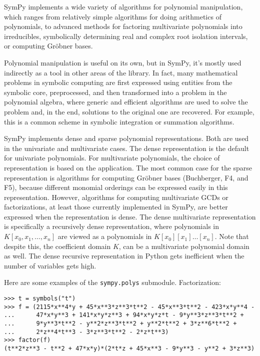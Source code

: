 
SymPy implements a wide variety of algorithms for polynomial manipulation,
which ranges from relatively simple algorithms for doing arithmetics of
polynomials, to advanced methods for factoring multivariate polynomials
into irreducibles, symbolically determining real and complex root isolation
intervals, or computing Gröbner bases.

Polynomial manipulation is useful on its own, but in SymPy, it's mostly used
indirectly as a tool in other areas of the library. In fact, many mathematical
problems in symbolic computing are first expressed using entities from the
symbolic core, preprocessed, and then transformed into a problem in the
polynomial algebra, where generic and efficient algorithms are used to solve
the problem and, in the end, solutions to the original one are recovered. For
example, this is a common scheme in symbolic integration or summation
algorithms.

SymPy implements dense and sparse polynomial representations. Both are used in
the univariate and multivariate cases. The dense representation is the default
for univariate polynomials. For multivariate polynomials, the choice of
representation is based on the application. The most common case for the sparse
representation is algorithms for computing Gröbner bases (Buchberger, F4, and
F5),
because different monomial orderings can be expressed easily in this
representation. However, algorithms for computing multivariate GCDs or
factorizations, at least those currently implemented in SymPy,
are better expressed when the representation is dense. The dense multivariate
representation is specifically a recursively dense representation, where
polynomials in $K[x_0, x_1,\dots, x_n]$ are viewed as a polynomials in
$K[x_0][x_1]\ldots[x_n]$. Note that despite this, the coefficient domain $K$,
can be a multivariate polynomial domain as well. The dense recursive
representation in Python gets inefficient when the number of variables gets
high.

Here are some examples of the \texttt{sympy.polys} submodule.
\noindent Factorization:
\begin{verbatim}
>>> t = symbols("t")
>>> f = (2115*x**4*y + 45*x**3*z**3*t**2 - 45*x**3*t**2 - 423*x*y**4 -
...      47*x*y**3 + 141*x*y*z**3 + 94*x*y*z*t - 9*y**3*z**3*t**2 +
...      9*y**3*t**2 - y**2*z**3*t**2 + y**2*t**2 + 3*z**6*t**2 +
...      2*z**4*t**3 - 3*z**3*t**2 - 2*z*t**3)
>>> factor(f)
(t**2*z**3 - t**2 + 47*x*y)*(2*t*z + 45*x**3 - 9*y**3 - y**2 + 3*z**3)
\end{verbatim}

